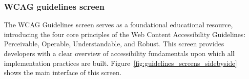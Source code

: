 \subsubsection{WCAG guidelines screen}
\label{subsubsec:guidelines-screen}

The WCAG Guidelines screen serves as a foundational educational resource, introducing the four core principles of the Web Content Accessibility Guidelines: Perceivable, Operable, Understandable, and Robust. This screen provides developers with a clear overview of accessibility fundamentals upon which all implementation practices are built. Figure~\ref{fig:guidelines_screens_sidebyside} shows the main interface of this screen.

\pagebreak

\begin{figure}[ht]
    \centering
    \begin{subfigure}[b]{0.48\textwidth}
        \centering

\end{subfigure}
\end{figure}
